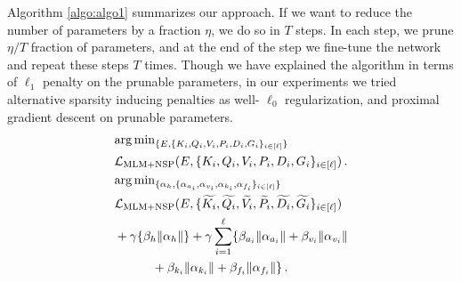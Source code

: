 \documentclass[11pt,a4paper]{article}
\begin{document}
Algorithm \ref{algo:algo1} summarizes our approach. If we want to reduce the number of parameters by a fraction $\eta$, we do so in $T$ steps. In each step, we prune $\eta/T$ fraction of parameters, and at the end of the step we fine-tune the network and repeat these steps $T$ times. 
Though we have explained the algorithm in terms of $\ell_1$ penalty on the prunable parameters, in our experiments we tried alternative sparsity inducing penalties as well- $\ell_0$ regularization, and proximal gradient descent on prunable parameters. 
\begin{align}
& {\arg\min}_{\{E,\{K_i, Q_i, V_i, P_i, D_i, G_i\}_{i \in [\ell]} \}} \nonumber\\
    & \mathcal{L_{\rm MLM + NSP}}(E,\{K_i, Q_i, V_i, P_i, D_i, G_i\}_{i \in [\ell]})\,.      \label{eq:org_loss} \\
& {\arg\min}_{\{\alpha_h,\{\alpha_{a_i}, \alpha_{v_i}, \alpha_{k_i},  \alpha_{f_i}\}_{i \in [\ell]} \}} \nonumber\\
    & \mathcal{L_{\rm MLM + NSP}}(E,\{\widetilde{K_i}, \widetilde{Q_i}, \widetilde{V_i}, 
    \widetilde{P_i}, \widetilde{D_i}, \widetilde{G_i}\}_{i \in [\ell]}) \nonumber\\
        & + \gamma\{\beta_h\|\alpha_h\|\} + \gamma\sum_{i=1}^{\ell}\{\beta_{a_i}\|\alpha_{a_i}\|
         + \beta_{v_i}\|\alpha_{v_i}\| \nonumber\\
         & \quad\quad \quad+ \beta_{k_i}\|\alpha_{k_i}\| 
         + \beta_{f_i}\|\alpha_{f_i}\| \} \,.
    \label{eq:prune_loss}
\end{align}
\renewcommand{\algorithmicrequire}{\textbf{Input:}}
\renewcommand{\algorithmicensure}{\textbf{Output:}}
\end{document}
